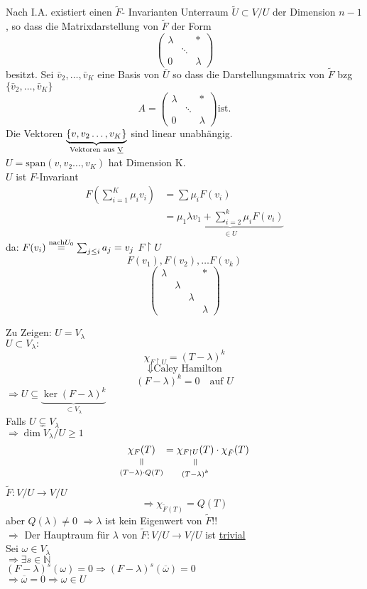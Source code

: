 \documentclass[titlepage,12pt,a4paper,ngerman]{report}
\newcommand{\verteq}{\rotatebox{90}{$\,=$}}
\newcommand{\equalto}[2]{\underset{\scriptstyle\overset{\mkern4mu\verteq}{#2}}{#1}}
\newcommand{\tx}[1]{\textrm{#1}}
\newcommand{\ov}[1]{\overline{#1}}
\newcommand{\ub}[1]{\underbrace{#1}}
\begin{document}
Nach I.A. existiert einen $\tilde{F}$- Invarianten Unterraum $\tilde{U} \subset V / U$ der Dimension $n-1$, so dass die Matrixdarstellung von $\tilde{F}$ der Form 
$$\begin{pmatrix}
\lambda & & * \\ & \ddots & \\ 0 & & \lambda
\end{pmatrix}$$
besitzt.
Sei $\bar{v}_2, \dots, \bar{v}_K$ eine Basis von $\bar{U}$ so dass die Darstellungsmatrix von $\tilde{F}$ bzg $\{ \bar{v}_2, \dots, \bar{v}_K \}$ 
$$A =\begin{pmatrix}
\lambda & & * \\ & \ddots & \\ 0 & & \lambda
\end{pmatrix} \tx{ist.}$$
Die Vektoren $\underbrace{\{ v, v_2 \dots , v_K \}}_{\tx{Vektoren aus \underline{V}}}$
sind linear unabhängig.\\
$U = \tx{span} (v, v_2 \dots , v_K)$ hat Dimension K.\\

$U$ ist $F$-Invariant 
\begin{align*}
F( \sum_{i=1}^{K} \mu_i v_i) &= \sum \mu_i F(v_i) \\
&= \underbrace{\mu_1 \lambda v_1 + \sum^k_{i=2} \mu_i F(v_i) }_{\in U}
\end{align*}
da: $ F(v_i) \buildrel \tx{nach} U_0 \over = \sum_{j\le i} a_j = v_j$ 
$F \upharpoonright U$
$$F(v_1),F(v_2), \dots F(v_k)$$
$$\begin{pmatrix}
\lambda & & & *\\
& \lambda \\
& & \lambda \\
& & & \lambda
\end{pmatrix}$$

Zu Zeigen: $U = V_\lambda$\\
$U \subset V_\lambda: $\\
$$\chi_{F \upharpoonright U} = (T-\lambda)^{k}$$
$$\Downarrow \tx{Caley Hamilton}$$
$$(F-\lambda)^{k}= 0 \quad \tx{auf } U$$
$\Rightarrow U \subseteq \ub{\ker(F-\lambda)^k}_{\subset V_\lambda} $\\
Falls $ U \subsetneq V_\lambda $\\
$\Rightarrow \dim V_\lambda/ U \ge 1$
$$\equalto{\chi_F(T)}{(T-\lambda)\cdot Q(T)} = \equalto{\chi_{F \upharpoonright U}(T)}{(T-\lambda)^k} \cdot \chi_{\tilde{F}} (T)$$
$\tilde{F}: V/U \to V/U$
$$\Rightarrow \chi_{\tilde{F}(T)} = Q(T) $$
aber $ Q(\lambda) \neq 0$ 
$\Rightarrow \lambda$ ist kein Eigenwert von $ \tilde{F} $!!\\
$\Rightarrow$ Der Hauptraum für $ \lambda $ von $\tilde{F}: V/U \to V/U$ ist \underline{trivial}\\
Sei $\omega \in V_\lambda$\\
$\Rightarrow \exists s \in \mathbb{N}$\\
$(F-\lambda)^s(\omega) = 0 \Rightarrow (F -\lambda)^s(\ov{\omega}) = 0$\\
$\Rightarrow \ov{\omega} = 0 \Rightarrow \omega \in U$
\end{document}
